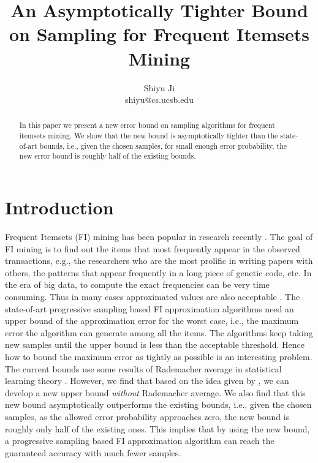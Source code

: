 \documentclass{article}
\begin{document}
\title{\Large\bf An Asymptotically Tighter Bound on Sampling for Frequent Itemsets Mining}
\author{Shiyu Ji\\ shiyu@cs.ucsb.edu}
\date{}
\maketitle

\newtheorem{definition}{Definition}
\theoremstyle{definition}
\newtheorem{theorem}{Theorem}
\theoremstyle{plain}
\newtheorem{lemma}{Lemma}
\theoremstyle{plain}
\newtheorem{corollary}{Corollary}
\theoremstyle{plain}

\begin{abstract}
In this paper we present a new error bound on sampling algorithms for frequent itemsets mining. We show that the new bound is asymptotically tighter than the state-of-art bounds, i.e., given the chosen samples, for small enough error probability, the new error bound is roughly half of the existing bounds.
\end{abstract}

\section{Introduction}
Frequent Itemsets (FI) mining has been popular in research recently \cite{AIS93, HCX07, RU15}. The goal of FI mining is to find out the items that most frequently appear in the observed transactions, e.g., the researchers who are the most prolific in writing papers with others, the patterns that appear frequently in a long piece of genetic code, etc. 
In the era of big data, to compute the exact frequencies can be very time consuming. Thus in many cases approximated values are also acceptable \cite{RU15}.
The state-of-art progressive sampling based FI approximation algorithms \cite{RU15} need an upper bound of the approximation error for the worst case, i.e., the maximum error the algorithm can generate among all the items. The algorithms keep taking new samples until the upper bound is less than the acceptable threshold. Hence how to bound the maximum error as tightly as possible is an interesting problem. The current bounds use some results of Rademacher average in statistical learning theory \cite{Vap98,Vap13,BBL04,BBL05}. 
However, we find that based on the idea given by \cite{BBL04}, we can develop a new upper bound \emph{without} Rademacher average. 
We also find that this new bound asymptotically outperforms the existing bounds, i.e., given the chosen samples, as the allowed error probability approaches zero, the new bound is roughly only half of the existing ones. This implies that by using the new bound, a progressive sampling based FI approximation algorithm can reach the guaranteed accuracy with much fewer samples. 
\end{document}
